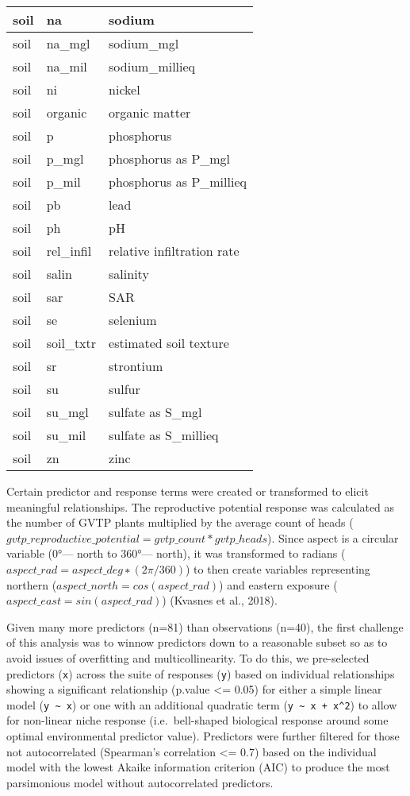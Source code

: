 \documentclass[
]{article}
\begin{document}
\begin{table}
\begin{tabular}[t]{l|l|l}
\hline
soil & na & sodium\\
\hline
soil & na\_mgl & sodium\_mgl\\
\hline
soil & na\_mil & sodium\_millieq\\
\hline
soil & ni & nickel\\
\hline
soil & organic & organic matter\\
\hline
soil & p & phosphorus\\
\hline
soil & p\_mgl & phosphorus as P\_mgl\\
\hline
soil & p\_mil & phosphorus as P\_millieq\\
\hline
soil & pb & lead\\
\hline
soil & ph & pH\\
\hline
soil & rel\_infil & relative infiltration rate\\
\hline
soil & salin & salinity\\
\hline
soil & sar & SAR\\
\hline
soil & se & selenium\\
\hline
soil & soil\_txtr & estimated soil texture\\
\hline
soil & sr & strontium\\
\hline
soil & su & sulfur\\
\hline
soil & su\_mgl & sulfate as S\_mgl\\
\hline
soil & su\_mil & sulfate as S\_millieq\\
\hline
soil & zn & zinc\\
\hline
\end{tabular}
\end{table}

Certain predictor and response terms were created or transformed to elicit meaningful relationships. The reproductive potential response was calculated as the number of GVTP plants multiplied by the average count of heads (\(gvtp\_reproductive\_potential = gvtp\_count * gvtp\_heads\)). Since aspect is a circular variable (0°--- north to 360°--- north), it was transformed to radians (\(aspect\_rad = aspect\_deg ∗ (2π/360)\)) to then create variables representing northern (\(aspect\_north =cos(aspect\_rad)\)) and eastern exposure (\(aspect\_east = sin(aspect\_rad)\)) (Kvasnes et al., 2018).

Given many more predictors (n=81) than observations (n=40), the first challenge of this analysis was to winnow predictors down to a reasonable subset so as to avoid issues of overfitting and multicollinearity. To do this, we pre-selected predictors (\texttt{x}) across the suite of responses (\texttt{y}) based on individual relationships showing a significant relationship (p.value \textless= 0.05) for either a simple linear model (\texttt{y\ \textasciitilde{}\ x}) or one with an additional quadratic term (\texttt{y\ \textasciitilde{}\ x\ +\ x\^{}2}) to allow for non-linear niche response (i.e.~bell-shaped biological response around some optimal environmental predictor value). Predictors were further filtered for those not autocorrelated (Spearman's correlation \textless= 0.7) based on the individual model with the lowest Akaike information criterion (AIC) to produce the most parsimonious model without autocorrelated predictors.
\end{document}
